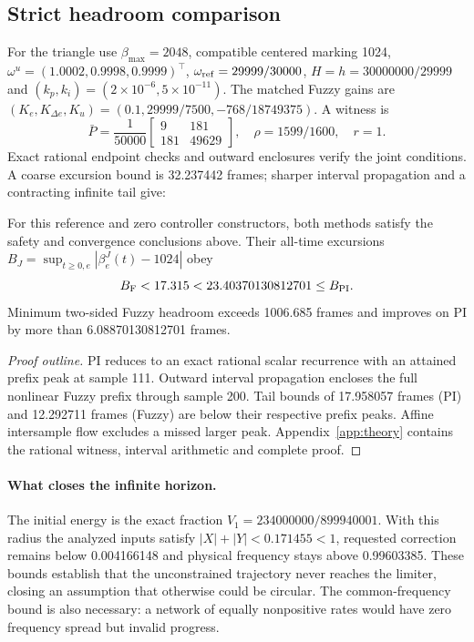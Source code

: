 \subsection{Strict headroom comparison}
For the triangle use $\beta_{\max}=2048$, compatible centered marking 1024,
$\omega^u=(1.0002,0.9998,0.9999)^\top$,
$\omega_{\rm ref}=29999/30000$, $H=h=30000000/29999$ and
$(k_p,k_i)=(2\times10^{-6},5\times10^{-11})$.
The matched Fuzzy gains are
$(K_e,K_{\Delta e},K_u)=(0.1,29999/7500,-768/18749375)$.
A witness is
\begin{equation}
 \bar P=\frac1{50000}\begin{bmatrix}9&181\\181&49629\end{bmatrix},
 \quad\rho=1599/1600,\quad r=1.
\end{equation}
Exact rational endpoint checks and outward enclosures verify the
joint conditions. A coarse excursion bound is 32.237442 frames;
sharper interval propagation and a contracting infinite tail give:
\begin{btdtheorem}
\label{thm:btd_headroom}
For this reference and zero controller constructors, both methods
satisfy the safety and convergence conclusions above. Their
all-time excursions $B_J=\sup_{t\ge0,e}|\beta_e^J(t)-1024|$ obey
\begin{equation}
 B_{\rm F}<17.315<23.40370130812701\le B_{\rm PI}.
 \label{eq:btd_strict_comparison}
\end{equation}
Minimum two-sided Fuzzy headroom exceeds 1006.685 frames and
improves on PI by more than 6.08870130812701 frames.
\end{btdtheorem}
\begin{proof}[Proof outline]
PI reduces to an exact rational scalar recurrence with an attained
prefix peak at sample 111. Outward interval propagation encloses the
full nonlinear Fuzzy prefix through sample 200. Tail bounds of
17.958057 frames (PI) and 12.292711 frames (Fuzzy) are below their
respective prefix peaks. Affine intersample flow excludes a missed
larger peak. Appendix~\ref{app:theory} contains the rational witness,
interval arithmetic and complete proof.
\end{proof}
\paragraph{What closes the infinite horizon.}
The initial energy is the exact fraction
$V_1=234000000/899940001$. With this radius the analyzed inputs
satisfy $|X|+|Y|<0.171455<1$, requested correction remains below
0.004166148 and physical frequency stays above 0.99603385.
These bounds establish that the unconstrained trajectory never reaches
the limiter, closing an assumption that otherwise could be circular.
The common-frequency bound is also necessary: a network of equally
nonpositive rates would have zero frequency spread but invalid progress.

